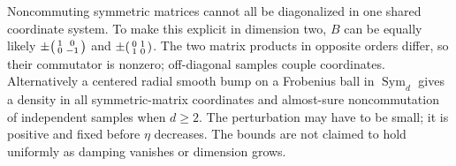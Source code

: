 Noncommuting symmetric matrices cannot all be diagonalized in one shared
coordinate system. To make this explicit in dimension two, $B$ can be
equally likely
$\pm\begin{psmallmatrix}1&0\\0&-1\end{psmallmatrix}$ and
$\pm\begin{psmallmatrix}0&1\\1&0\end{psmallmatrix}$. The two matrix products in opposite orders differ, so their commutator
is nonzero; off-diagonal samples couple coordinates. Alternatively a
centered radial smooth bump on a Frobenius ball in $\operatorname{Sym}_d$
gives a density in all symmetric-matrix coordinates and almost-sure
noncommutation of
independent samples when $d\geq2$. The perturbation may have to be small;
it is positive and fixed before $\eta$ decreases. The bounds are not claimed to hold uniformly as damping vanishes or
dimension grows.
